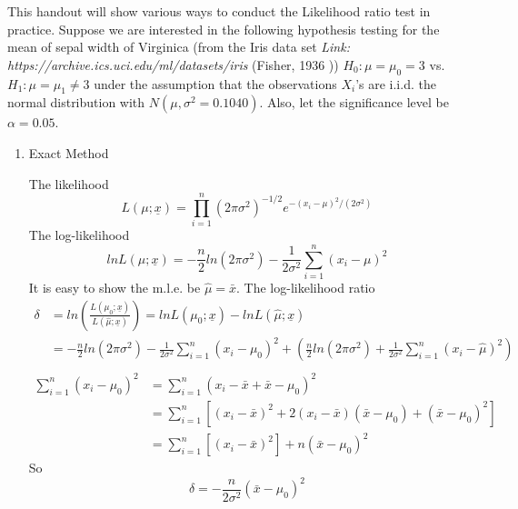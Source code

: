 This handout will show various ways to conduct the Likelihood ratio test in practice. Suppose we are interested in the following hypothesis testing for the mean of sepal width of Virginica (from the Iris data set \textit{Link:
https://archive.ics.uci.edu/ml/datasets/iris} (Fisher, 1936 \cite{Iris})) $H_0:\mu = \mu_0 = 3$ vs. $H_1: \mu = \mu_1 \ne 3$ under the assumption that the observations $X_i$'s are i.i.d. the normal distribution with $N(\mu, \sigma^2 = 0.1040)$. Also, let the significance level be $\alpha = 0.05$.
\begin{enumerate}
	\item Exact Method
		\par The likelihood 
		\begin{equation*}
			L(\mu;\underline{x}) = \prod_{i=1}^{n}(2\pi\sigma^2)^{-1/2}e^{-(x_i-\mu)^2/(2\sigma^2)}
		\end{equation*}
		The log-likelihood
		\begin{equation}
			lnL(\mu;\underline{x}) = -\frac{n}{2}ln(2\pi\sigma^2)-\frac{1}{2\sigma^2}\sum_{i=1}^{n}(x_i-\mu)^2
		\end{equation}
		It is easy to show the m.l.e. be $\hat{\mu} = \bar{x}$. The log-likelihood ratio
		\begin{equation*}
			\begin{split}
				\delta &= ln( \frac{L(\mu_0;\underline{x})}{L(\hat{\mu};\underline{x})} ) = lnL(\mu_0;\underline{x}) - lnL(\hat{\mu};\underline{x}) \\
				& = -\frac{n}{2}ln(2\pi\sigma^2)-\frac{1}{2\sigma^2}\sum_{i=1}^{n}(x_i-\mu_0)^2 + (\frac{n}{2}ln(2\pi\sigma^2) + \frac{1}{2\sigma^2}\sum_{i=1}^{n}(x_i-\hat{\mu})^2) \\
			\end{split}
		\end{equation*}
		\begin{equation*}
			\begin{split}
				\sum_{i=1}^{n}(x_i-\mu_0)^2 & = \sum_{i=1}^{n}(x_i - \bar{x} + \bar{x} -\mu_0)^2 \\
				& = \sum_{i=1}^{n} [(x_i - \bar{x})^2 + 2(x_i - \bar{x})(\bar{x} - \mu_0) + (\bar{x} - \mu_0)^2] \\
				& = \sum_{i=1}^{n} [(x_i - \bar{x})^2] + n(\bar{x} - \mu_0)^2
			\end{split}
		\end{equation*}
		So
		\begin{equation*}
			\delta = -\frac{n}{2\sigma^2}(\bar{x} - \mu_0)^2
		\end{equation*}

\end{enumerate}
